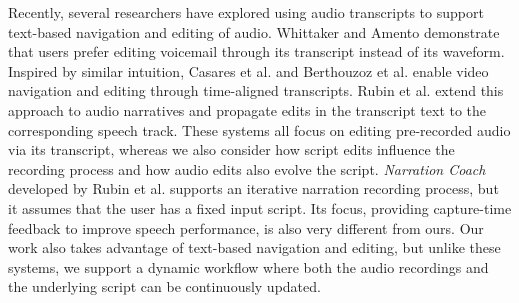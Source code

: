 Recently, several researchers have explored using audio transcripts to support text-based navigation and editing of audio. Whittaker and Amento \cite{whittaker2004semantic} demonstrate that users prefer editing voicemail through its transcript instead of its waveform. Inspired by similar intuition, Casares et al. \cite{casares2002simplifying} and Berthouzoz et al. \cite{berthouzoz2012tools} enable video navigation and editing through time-aligned transcripts. Rubin et al. \cite{rubin2013content} extend this approach to audio narratives and propagate edits in the transcript text to the corresponding speech track. These systems all focus on editing pre-recorded audio via its transcript, whereas we also consider how script
edits influence the recording process and how audio edits
also evolve the script. 
%
\textit{Narration Coach} developed by Rubin et al. 
supports an iterative narration recording process, but it assumes that the user has a fixed input script. Its focus, providing capture-time feedback to improve speech performance, is also very different from ours. Our work also takes advantage of text-based navigation and editing, but unlike these systems, we support a dynamic workflow where both the audio recordings and the underlying script can be continuously  updated.      
